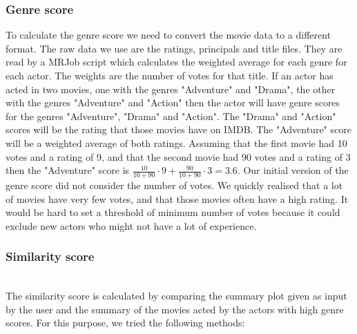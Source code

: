 \subsubsection{Genre score}
To calculate the genre score we need to convert the movie data to a different format. The raw data we use are the ratings, principals and title files. They are read by a MRJob script which calculates the weighted average for each genre for each actor. The weights are the number of votes for that title. If an actor has acted in two movies, one with the genres "Adventure" and "Drama", the other with the genres "Adventure" and "Action" then the actor will have genre scores for the genres "Adventure", "Drama" and "Action". The "Drama" and "Action" scores will be the rating that those movies have on IMDB. The "Adventure" score will be a weighted average of both ratings. Assuming that the first movie had 10 votes and a rating of 9, and that the second movie had 90 votes and a rating of 3 then the "Adventure" score is $\frac{10}{10+90}\cdot9+\frac{90}{10+90}\cdot3=3.6$. Our initial version of the genre score did not consider the number of votes. We quickly realised that a lot of movies have very few votes, and that those movies often have a high rating. It would be hard to set a threshold of minimum number of votes because it could exclude new actors who might not have a lot of experience. 

\subsubsection{Similarity score} \\
The similarity score is calculated by comparing the summary plot given as input by the user and the summary of the movies acted by the actors with high genre scores. For this purpose, we tried the following methods: 

